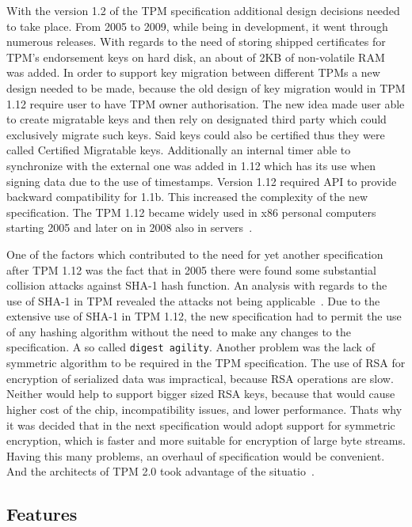 With the version 1.2 of the TPM specification additional design decisions needed to take place. From 2005 to 2009, while being in development, it went through numerous releases. With regards to the need of storing shipped certificates for TPM's endorsement keys on hard disk, an about of 2KB of non-volatile RAM was added. In order to support key migration between different TPMs a new design needed to be made, because the old design of key migration would in TPM 1.12 require user to have TPM owner authorisation. The new idea made user able to create migratable keys and then rely on designated third party which could exclusively migrate such keys. Said keys could also be certified thus they were called Certified Migratable keys. Additionally an internal timer able to synchronize with the external one was added in 1.12 which has its use when signing data due to the use of timestamps. Version 1.12 required API to provide backward compatibility for 1.1b. This increased the complexity of the new specification. The TPM 1.12 became widely used in x86 personal computers starting 2005 and later on in 2008 also in servers~\cite{arthur2015practical}.

One of the factors which contributed to the need for yet another specification after TPM 1.12 was the fact that in 2005 there were found some substantial collision attacks against SHA-1 hash function. An analysis with regards to the use of SHA-1 in TPM revealed the attacks not being applicable~\cite{tcg_tpm1.12_sha-1_uses}. Due to the extensive use of SHA-1 in TPM 1.12, the new specification had to permit the use of any hashing algorithm without the need to make any changes to the specification. A so called \texttt{digest agility}. Another problem was the lack of symmetric algorithm to be required in the TPM specification. The use of RSA for encryption of serialized data was impractical, because RSA operations are slow. Neither would help to support bigger sized RSA keys, because that would cause higher cost of the chip, incompatibility issues, and lower performance. Thats why it was decided that in the next specification would adopt support for symmetric encryption, which is faster and more suitable for encryption of large byte streams. Having this many problems, an overhaul of specification would be convenient. And the architects of TPM 2.0 took advantage of the situatio~\cite{arthur2015practical}.


\subsection{Features}


